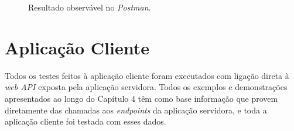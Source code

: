 \begin{figure}[h]
	\begin{center}
	\end{center}
	\caption{Resultado observável no \emph{Postman}.}\label{fig:eventdelete404}
\end{figure}
\newpage
\section{Aplicação Cliente}\label{sec52}
Todos os testes feitos à aplicação cliente foram executados com ligação direta à \textit{web API} exposta pela aplicação servidora. Todos os exemplos e demonstrações apresentados ao longo do Capítulo 4 têm como base informação que provem diretamente das chamadas aos \textit{endpoints} da aplicação servidora, e toda a aplicação cliente foi testada com esses dados.